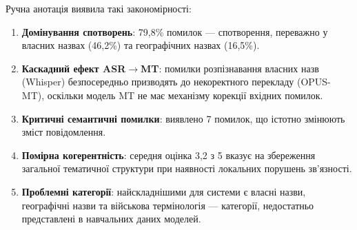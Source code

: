 Ручна анотація виявила такі закономірності:

\begin{enumerate}
    \item \textbf{Домінування спотворень}: 79,8\% помилок --- спотворення,
    переважно у власних назвах (46,2\%) та географічних назвах (16,5\%).

    \item \textbf{Каскадний ефект ASR$\rightarrow$MT}: помилки розпізнавання
    власних назв (Whisper) безпосередньо призводять до некоректного перекладу
    (OPUS-MT), оскільки модель MT не має механізму корекції вхідних помилок.

    \item \textbf{Критичні семантичні помилки}: виявлено 7 помилок, що істотно
    змінюють зміст повідомлення.

    \item \textbf{Помірна когерентність}: середня оцінка 3,2 з 5 вказує на
    збереження загальної тематичної структури при наявності локальних порушень
    зв'язності.

    \item \textbf{Проблемні категорії}: найскладнішими для системи є власні
    назви, географічні назви та військова термінологія --- категорії, недостатньо
    представлені в навчальних даних моделей.
\end{enumerate}

